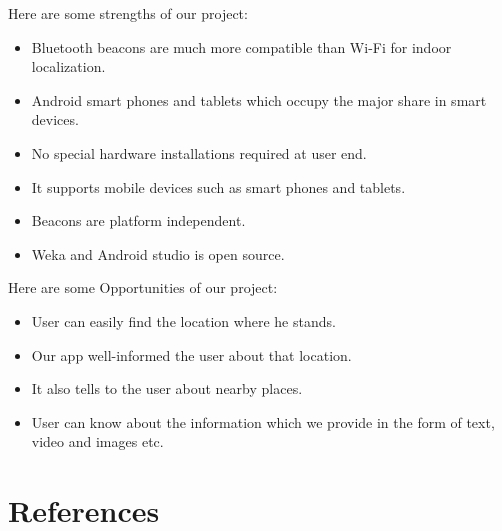 \documentclass{article}
\begin{document}
Here are some strengths of our project:
\begin{itemize}
\item Bluetooth beacons are much more compatible than Wi-Fi for indoor localization.
\item Android smart phones and tablets which occupy the major share in smart devices.
\item No special hardware installations required at user end.
\item It supports mobile devices such as  smart phones and tablets. 
\item Beacons are platform independent. 
\item Weka and Android studio is open source.
\end{itemize}
Here are some Opportunities of our project:
\begin{itemize}
\item User can easily find the location where he stands.
\item Our app well-informed the user about that location.
\item It also tells to the user about nearby places.
\item User can know about the information which we provide in the form of text, video and images etc.
\end{itemize}
\pagebreak



\section{References}




\end{document}

